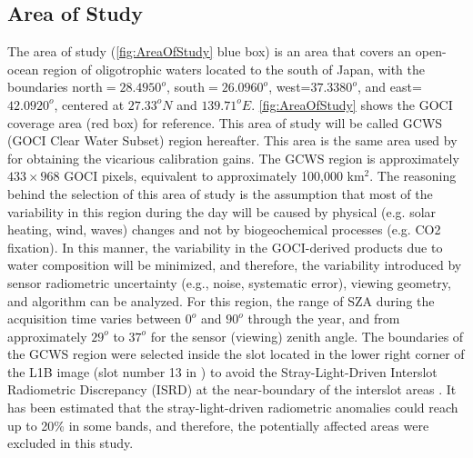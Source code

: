 \documentclass[remotesensing,article,submit,moreauthors,pdftex,10pt,a4paper]{Definitions/mdpi}
\begin{document}
\subsection{Area of Study}
The area of study (\autoref{fig:AreaOfStudy} blue box) is an area that covers an open-ocean region of oligotrophic waters located to the south of Japan, with the boundaries north$=28.4950^o$, south$=26.0960^o$, west=$ 37.3380^o$, and east=$ 42.0920^o$, centered at $27.33^oN$ and $139.71^oE$. \autoref{fig:AreaOfStudy} shows the GOCI coverage area (red box) for reference. This area of study will be called GCWS (GOCI Clear Water Subset) region hereafter. This area is the same area used by \cite{Concha_2018a} for obtaining the vicarious calibration gains. The GCWS region is approximately $433\times968$ GOCI pixels, equivalent to approximately 100,000 km$^2$. The reasoning behind the selection of this area of study is the assumption that most of the variability in this region during the day will be caused by physical (e.g. solar heating, wind, waves) changes and not by biogeochemical processes (e.g. CO2 fixation). In this manner, the variability in the GOCI-derived products due to water composition will be minimized, and therefore, the variability introduced by sensor radiometric uncertainty (e.g., noise, systematic error), viewing geometry, and algorithm can be analyzed. For this region, the range of SZA during the acquisition time varies between $0^o$ and $90^o$ through the year, and from approximately $29^o$ to $37^o$ for the sensor (viewing) zenith angle. The boundaries of the GCWS region were selected inside the slot located in the lower right corner of the L1B image (slot number 13 in \cite{Kim:2015}) to avoid the Stray-Light-Driven Interslot Radiometric Discrepancy (ISRD) at the near-boundary of the interslot areas \cite{Kim:2015,Kim:2016}. It has been estimated that the stray-light-driven radiometric anomalies could reach up to 20\% in some bands, and therefore, the potentially affected areas were excluded in this study. 
\end{document}
